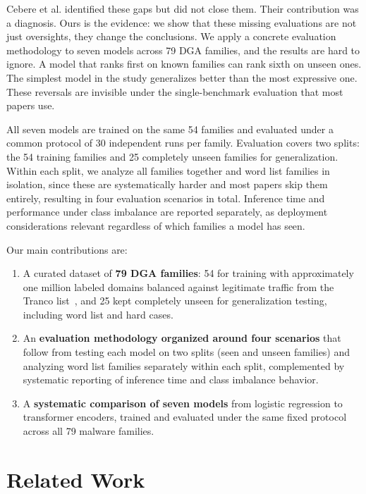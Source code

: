 \documentclass[conference]{IEEEtran}
\begin{document}
Cebere et al. identified these gaps but did not close them. Their contribution was a diagnosis. Ours is the evidence: we show that these missing evaluations are not just oversights, they change the conclusions. We apply a concrete evaluation methodology to seven models across 79 DGA families, and the results are hard to ignore. A model that ranks first on known families can rank sixth on unseen ones. The simplest model in the study generalizes better than the most expressive one. These reversals are invisible under the single-benchmark evaluation that most papers use.

All seven models are trained on the same 54 families and evaluated under a common protocol of 30 independent runs per family. Evaluation covers two splits: the 54 training families and 25 completely unseen families for generalization. Within each split, we analyze all families together and word list families in isolation, since these are systematically harder and most papers skip them entirely, resulting in four evaluation scenarios in total. Inference time and performance under class imbalance are reported separately, as deployment considerations relevant regardless of which families a model has seen.             
          
Our main contributions are:

\begin{enumerate}
\item A curated dataset of \textbf{79 DGA families}: 54 for training with approximately one million labeled domains balanced against legitimate traffic from the Tranco list~\cite{tranco}, and 25 kept completely unseen for generalization testing, including word list and hard cases.
\item An \textbf{evaluation methodology organized around four scenarios} that follow from testing each model on two splits (seen and unseen families) and analyzing word list families separately within each split, complemented by systematic reporting of inference time and class imbalance behavior.
\item A \textbf{systematic comparison of seven models} from logistic regression to transformer encoders, trained and evaluated under the same fixed protocol across all 79 malware families.
\end{enumerate}

\section{Related Work}
\label{sec:related}
\end{document}
